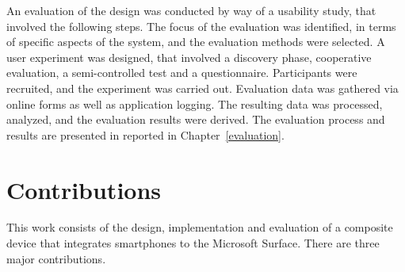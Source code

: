 An evaluation of the design was conducted by way of a usability study, that involved the following steps.
The focus of the evaluation was identified, in terms of specific aspects of the system, and the evaluation methods were selected.
A user experiment was designed, that involved a discovery phase, cooperative evaluation, a semi-controlled test and a questionnaire.
Participants were recruited, and the experiment was carried out.
Evaluation data was gathered via online forms as well as application logging.
The resulting data was processed, analyzed, and the evaluation results were derived.
The evaluation process and results are presented in reported in Chapter~\ref{evaluation}.

\section{Contributions}

This work consists of the design, implementation and evaluation of a composite device that integrates smartphones to the Microsoft Surface.
There are three major contributions.

